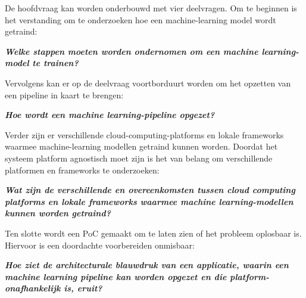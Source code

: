 De hoofdvraag kan worden onderbouwd met vier deelvragen. Om te beginnen is het verstanding om te onderzoeken hoe een \gls{machine-learning} model wordt getraind:\smallskip

\begin{center}
  \textbf{
    \textit{
      Welke stappen moeten worden ondernomen om een machine learning-model te trainen?
    }
  }
\end{center}\smallskip

Vervolgens kan er op de deelvraag voortborduurt worden om het opzetten van een pipeline in kaart te brengen:\smallskip

\begin{center}
  \textbf{
    \textit{
      Hoe wordt een machine learning-pipeline opgezet?
    }
  }
\end{center}\smallskip

Verder zijn er verschillende \glspl{cloud-computing-platform} en lokale frameworks waarmee \gls{machine-learning} modellen getraind kunnen worden. Doordat het systeem platform agnostisch moet zijn is het van belang om verschillende platformen en frameworks te onderzoeken:

\begin{center}
  \textbf{
    \textit{
      Wat zijn de verschillende en overeenkomsten tussen cloud computing platforms en lokale frameworks waarmee machine learning-modellen kunnen worden getraind?
    }
  }
\end{center}\smallskip

Ten slotte wordt een PoC gemaakt om te laten zien of het probleem oplosbaar is. Hiervoor is een doordachte voorbereiden onmisbaar:\smallskip

\begin{center}
  \textbf{
    \textit{
      Hoe ziet de architecturale blauwdruk van een applicatie, waarin een machine learning pipeline kan worden opgezet en die platform-onafhankelijk is, eruit?
    }
  }
\end{center}